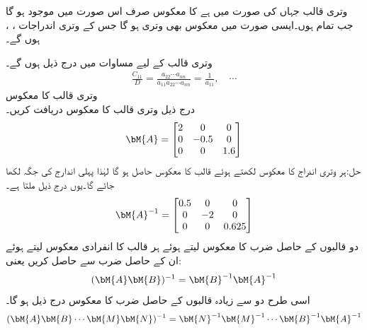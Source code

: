 وتری قالب  جہاں  کی صورت میں  ہے  کا معکوس صرف اس صورت میں موجود ہو گا جب تمام  ہوں۔ایسی صورت میں معکوس  بھی وتری ہو گا جس کے وتری اندراجات ، ،  ہوں گے۔

وتری قالب کے لیے مساوات  میں درج ذیل ہوں گے۔
\begin{align*}
\frac{C_{11}}{D}=\frac{a_{22}\cdots a_{nn}}{a_{11}a_{22}\cdots a_{nn}}=\frac{1}{a_{11}}, \quad \cdots
\end{align*}
\quad وتری قالب کا معکوس\\
درج ذیل وتری قالب کا معکوس دریافت کریں۔
\begin{align*}
\bM{A}=
\begin{bmatrix}
2&0&0\\
0&-0.5&0\\
0&0&1.6
\end{bmatrix}
\end{align*}
حل:ہر وتری اندراج کا معکوس لکھتے ہوئے قالب کا معکوس حاصل ہو گا لہٰذا پہلی اندارج  کی جگہ  لکھا جائے گا۔یوں درج ذیل ملتا ہے۔
\begin{align*}
\bM{A}^{-1}=
\begin{bmatrix}
0.5&0&0\\
0&-2&0\\
0&0&0.625
\end{bmatrix}
\end{align*}
دو  قالبوں کے حاصل ضرب کا معکوس لیتے ہوئے ہر قالب کا انفرادی معکوس لیتے ہوئے ان کے حاصل ضرب  سے حاصل کریں  یعنی:
\begin{align}\label{مساوات_الجبرا_ضرب_قالب_معکوس_الف}
(\bM{A}\bM{B})^{-1}=\bM{B}^{-1}\bM{A}^{-1}
\end{align}
اسی طرح دو سے زیادہ قالبوں کے حاصل ضرب کا معکوس درج ذیل ہو گا۔
\begin{align}\label{مساوات_الجبرا_ضرب_قالب_معکوس_ب}
(\bM{A}\bM{B}\cdots \bM{M}\bM{N})^{-1}=\bM{N}^{-1}\bM{M}^{-1}\cdots\bM{B}^{-1}\bM{A}^{-1}
\end{align}

